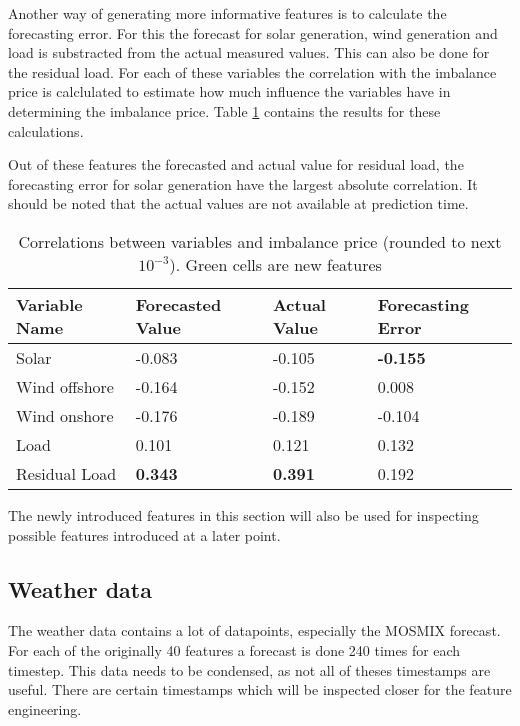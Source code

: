 \documentclass[class=scrbook, crop=false]{standalone}
\begin{document}
    Another way of generating more informative features is to calculate the forecasting error. 
    For this the forecast for solar generation, wind generation and load is substracted from the actual measured values.
    This can also be done for the residual load.
    For each of these variables the correlation with the imbalance price is calclulated to estimate how much influence the variables have in determining the imbalance price.
    Table \ref{Table::Rebap_Correlations_ENTSOE} contains the results for these calculations. 
    
    Out of these features the forecasted and actual value for residual load, the forecasting error for solar generation have the largest absolute correlation.
    It should be noted that the actual values are not available at prediction time.    

    \begin{table}
    \begin{tabular}{l|l|l|l}
    Variable Name	&Forecasted Value& Actual Value	& Forecasting Error \\\hline
    Solar 		& -0.083		& -0.105		& \cellcolor{green} \textbf{-0.155} \\
    Wind offshore 	& -0.164		& -0.152		& \cellcolor{green} 0.008 \\
    Wind onshore 	& -0.176		& -0.189		& \cellcolor{green} -0.104 \\
    Load 		&0.101		& 0.121		& \cellcolor{green}  0.132 \\
    Residual Load 	& \cellcolor{green} \textbf{0.343}& \cellcolor{green} \textbf{0.391}& \cellcolor{green}0.192\\
    \end{tabular}
    
    \caption{Correlations between variables and imbalance price (rounded to next $10^{-3}$). Green cells are new features}
    \label{Table::Rebap_Correlations_ENTSOE}
    \end{table}
    
    The newly introduced features in this section will also be used for inspecting possible features introduced at a later point.
    
    \subsection{Weather data}
    \label{Section::Weather_data}
    The weather data contains a lot of datapoints, especially the MOSMIX forecast. 
    For each of the originally 40 features a forecast is done 240 times for each timestep. 
    This data needs to be condensed, as not all of theses timestamps are useful.
    There are certain timestamps which will be inspected closer for the feature engineering.
    
\end{document}
